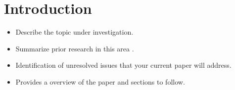 \section{Introduction}

\begin{itemize}
  \item Describe the topic under investigation.
  \item Summarize prior research in this area \citep{vaswani-2017-attention}.
  \item Identification of unresolved issues that your current paper will address.
  \item Provides a overview of the paper and sections to follow.
\end{itemize}
